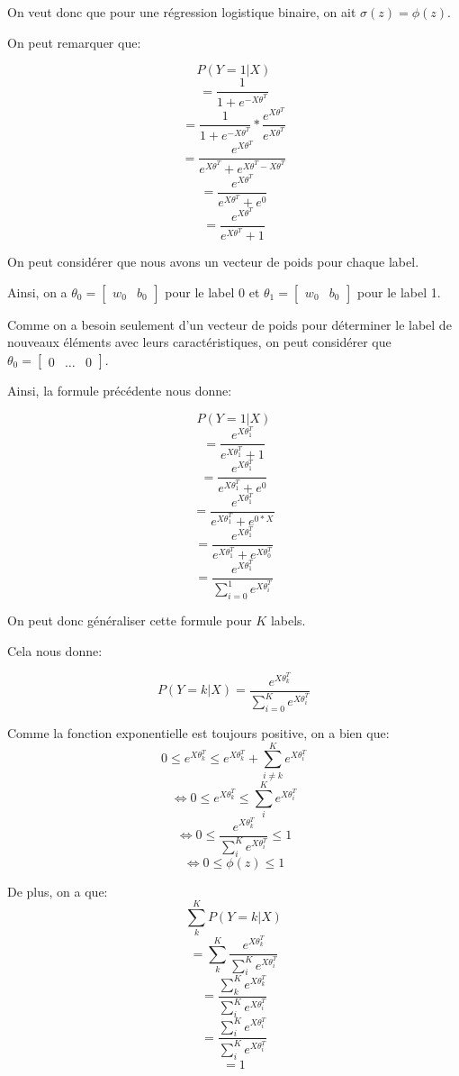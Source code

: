\documentclass[
]{article}
\begin{document}
On veut donc que pour une régression logistique binaire, on ait
\(\sigma(z) = \phi(z)\).

On peut remarquer que:

\[P(Y = 1 | X)\] \[=\frac{1}{1 + e^{-X \theta^T}}\]
\[=\frac{1}{1 + e^{-X \theta^T}} * \frac{e^{X \theta^T}}{e^{X \theta^T}}\]
\[=\frac{e^{X \theta^T}}{e^{X \theta^T} + e^{X \theta^T - X \theta^T}}\]
\[=\frac{e^{X \theta^T}}{e^{X \theta^T} + e^0}\]
\[=\frac{e^{X \theta^T}}{e^{X \theta^T} + 1}\]

On peut considérer que nous avons un vecteur de poids pour chaque label.

Ainsi, on a \(\theta_0 = \begin{bmatrix} w_0 & b_0 \end{bmatrix}\) pour
le label 0 et \(\theta_1 = \begin{bmatrix} w_0 & b_0 \end{bmatrix}\)
pour le label 1.

Comme on a besoin seulement d'un vecteur de poids pour déterminer le
label de nouveaux éléments avec leurs caractéristiques, on peut
considérer que
\(\theta_0 = \begin{bmatrix} 0 & \dots & 0 \end{bmatrix}\).

Ainsi, la formule précédente nous donne:

\[P(Y = 1 | X)\] \[=\frac{e^{X \theta_1^T}}{e^{X \theta_1^T} + 1}\]
\[=\frac{e^{X \theta_1^T}}{e^{X \theta_1^T} + e^0}\]
\[=\frac{e^{X \theta_1^T}}{e^{X \theta_1^T} + e^{0 * X}}\]
\[=\frac{e^{X \theta_1^T}}{e^{X \theta_1^T} + e^{X \theta_0^T}}\]
\[=\frac{e^{X \theta_1^T}}{\sum_{i = 0}^1 e^{X \theta_i^T}}\]

On peut donc généraliser cette formule pour \(K\) labels.

Cela nous donne:

\[P(Y = k| X )=\frac{e^{X \theta_k^T}}{\sum_{i = 0}^K e^{X \theta_i^T}}\]

Comme la fonction exponentielle est toujours positive, on a bien que:
\[0 \leq e^{X \theta_k^T} \leq e^{X \theta_k^T} + \sum_{i \neq k}^K e^{X \theta_i^T}\]
\[\Leftrightarrow 0 \leq e^{X \theta_k^T} \leq \sum_{i}^K e^{X \theta_i^T}\]
\[\Leftrightarrow 0 \leq \frac{e^{X \theta_k^T}}{\sum_{i}^K e^{X \theta_i^T}} \leq 1\]
\[\Leftrightarrow 0 \leq \phi(z) \leq 1\]

De plus, on a que: \[\sum_k^K P(Y = k | X)\]
\[=\sum_k^K \frac{e^{X \theta_k^T}}{\sum_i^K e^{X \theta_i^T}}\]
\[=\frac{\sum_k^Ke^{X \theta_k^T}}{\sum_i^K e^{X \theta_i^T}}\]
\[=\frac{\sum_i^Ke^{X \theta_i^T}}{\sum_i^K e^{X \theta_i^T}}\] \[=1\]
\end{document}

